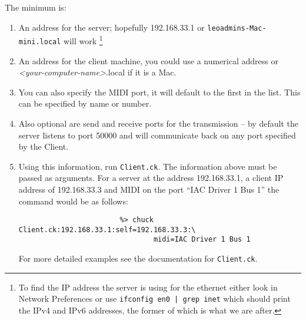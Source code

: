\documentclass[11pt]{article}
\begin{document}
\begin{enumerate} [\bf 1.]
\begin{enumerate} [\bf i.]
{			  The minimum is: }
		\begin{enumerate} [\bf a.]
			\item{An address for the server; hopefully 192.168.33.1 or \texttt{leoadmins-Mac-mini.local} will work
			\footnote{ To find the IP address the server is using for the ethernet either look in Network Preferences or use \verb+ifconfig en0 | grep inet+
			which should print the IPv4 and IPv6 addresses, the former of which is what we are after.}}
			\item{An address for the client machine, you could use a numerical address or \textit{<your-computer-name>}.local if it is a Mac.}
			\item{You can also specify the MIDI port, it will default to the first in the list. This can be specified by name or number.}
			\item{Also optional are send and receive ports for the transmission -- by default the server listens to port 50000 and will communicate back
				on any port specified by the Client.}
			\item{Using this information, run \texttt{Client.ck}. The information above must be passed as arguments. For a server at the address 
				192.168.33.1, a client IP address of 192.168.33.3 and MIDI on the port ``IAC Driver 1 Bus 1'' the command would be as follows:
				\begin{verbatim}
					    %> chuck Client.ck:192.168.33.1:self=192.168.33.3:\
					            midi=IAC Driver 1 Bus 1
				\end{verbatim}
				For more detailed examples see the documentation for \texttt{Client.ck}.}
		\end{enumerate}
	\end{enumerate}

\end{enumerate}
\end{document}
